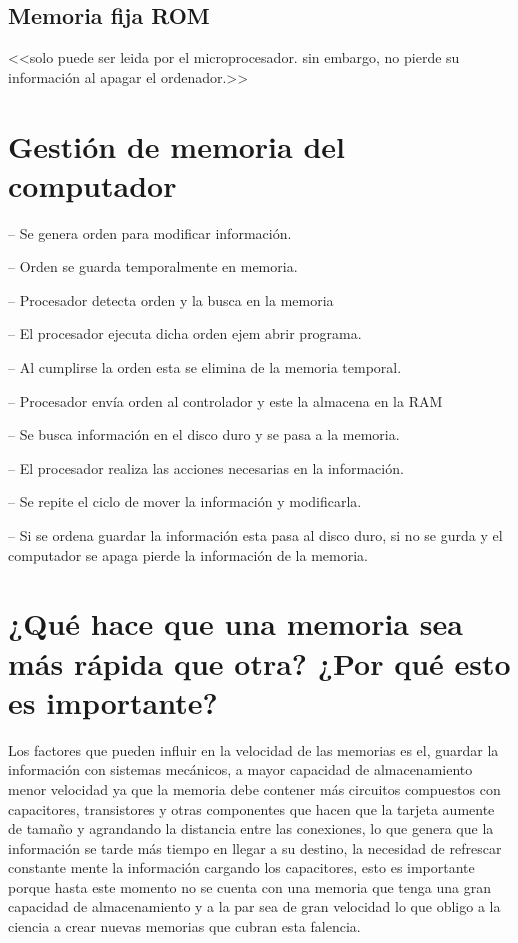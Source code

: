 \documentclass{article}
\begin{document}
\subsection{Memoria fija ROM  }
<<solo puede ser leida por el microprocesador. sin embargo, no pierde su información al apagar el ordenador.>> \cite{transistores}


\section{Gestión de memoria del computador}


-- Se genera orden para modificar información.

-- Orden se guarda temporalmente en memoria.

-- Procesador detecta orden y la busca en la memoria 

-- El procesador ejecuta dicha orden ejem abrir programa. 

-- Al cumplirse la orden esta se elimina de la memoria temporal.

-- Procesador envía orden al controlador y este la almacena en la RAM

-- Se busca información en el disco duro y se pasa a la memoria.

-- El procesador realiza las acciones necesarias en la información. 

-- Se repite el ciclo de mover la información y modificarla. 

-- Si se ordena guardar la información esta pasa al disco duro, si no se gurda y el computador se apaga pierde la información de la memoria.\cite{computadores}


\section{¿Qué hace que una memoria sea más rápida que otra? ¿Por qué esto es importante?}

Los factores que pueden influir en la velocidad de las memorias es el, guardar la información con sistemas mecánicos, a mayor capacidad de almacenamiento menor velocidad ya que la memoria debe contener más circuitos compuestos con capacitores, transistores y otras componentes que hacen que la tarjeta aumente de tamaño y agrandando   la distancia entre las conexiones, lo que genera que la información se tarde más tiempo en llegar a su destino, la necesidad de refrescar constante mente la información cargando los capacitores, esto es importante porque hasta este momento no se cuenta con una memoria que tenga una gran capacidad de almacenamiento y a la par sea de gran velocidad lo que obligo a la ciencia a crear nuevas memorias que cubran esta falencia. 
\end{document}
